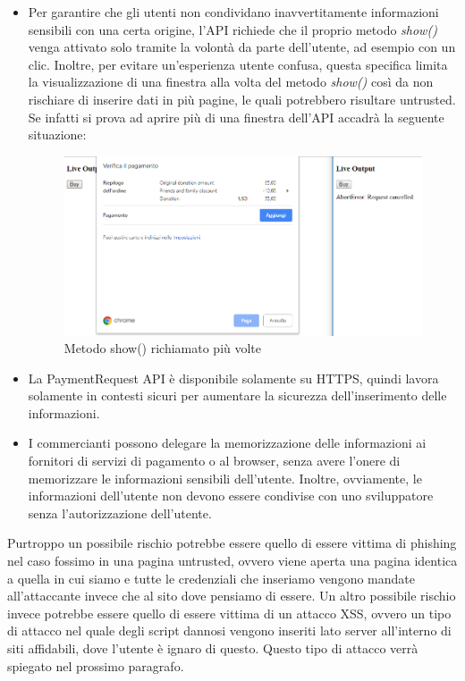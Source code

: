 \documentclass[11pt ,a4paper , twoside , openright ]{article}
\begin{document}
\begin{itemize}
\item Per garantire che gli utenti non condividano inavvertitamente informazioni sensibili con una certa origine, l'API richiede che il proprio metodo \textit{show()} venga attivato solo tramite la volontà da parte dell'utente, ad esempio con un clic. Inoltre, per evitare un'esperienza utente confusa, questa specifica limita la visualizzazione di una finestra alla volta del metodo \textit{show()} così da non rischiare di inserire dati in più pagine, le quali potrebbero risultare untrusted. 
Se infatti si prova ad aprire più di una finestra dell'API accadrà la seguente situazione:

\begin{figure}[h]
	\centering
	\includegraphics[width=0.5\linewidth]{Buy}
	\caption{Metodo show() richiamato più volte}
	\label{fig: Metodo show() richiamato più volte}
\end{figure}


\item La PaymentRequest API è disponibile solamente su HTTPS, quindi lavora solamente in contesti sicuri per aumentare la sicurezza dell'inserimento delle informazioni. 

\item I commercianti possono delegare la memorizzazione delle informazioni ai fornitori di servizi di pagamento o al browser, senza avere l'onere di memorizzare le informazioni sensibili dell'utente. Inoltre, ovviamente, le informazioni dell'utente non devono essere condivise con uno sviluppatore senza l'autorizzazione dell'utente.
\end{itemize}

Purtroppo un possibile rischio potrebbe essere quello di essere vittima di phishing nel caso fossimo in una pagina untrusted, ovvero viene aperta una pagina identica a quella in cui siamo e tutte le credenziali che inseriamo vengono mandate all'attaccante invece che al sito dove pensiamo di essere. 
Un altro possibile rischio invece potrebbe essere quello di essere vittima di un attacco XSS, ovvero un tipo di attacco nel quale degli script dannosi vengono inseriti lato server all'interno di siti affidabili, dove l'utente è ignaro di questo.
Questo tipo di attacco verrà spiegato nel prossimo paragrafo.
\end{document}
